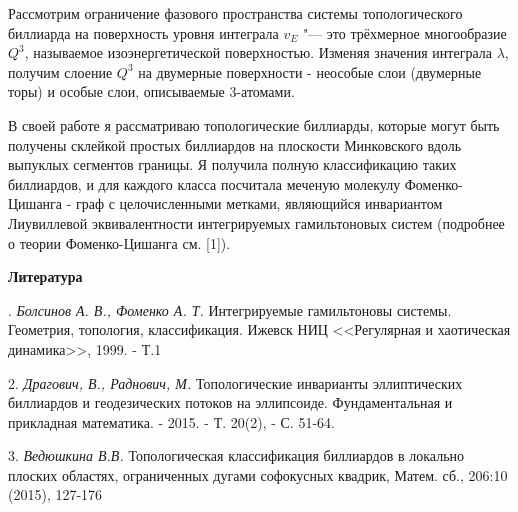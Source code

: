 Рассмотрим ограничение фазового пространства системы топологического биллиарда на поверхность уровня интеграла $v_E$ "--- это трёхмерное многообразие $Q^3$, называемое изоэнергетической поверхностью. Изменяя значения интеграла $\lambda$, получим слоение $Q^3$ на двумерные поверхности - неособые слои (двумерные торы) и особые слои, описываемые 3-атомами.

В своей работе я рассматриваю топологические биллиарды, которые могут быть получены склейкой простых биллиардов на плоскости Минковского вдоль выпуклых сегментов границы. Я получила полную классификацию таких биллиардов, и для каждого класса посчитала меченую молекулу Фоменко-Цишанга - граф с целочисленными метками, являющийся инвариантом Лиувиллевой эквивалентности интегрируемых гамильтоновых систем (подробнее о теории Фоменко-Цишанга см. [1]).





\smallskip \centerline {\bf Литература} . {\it Болсинов А. В., Фоменко А. Т.} Интегрируемые гамильтоновы системы. Геометрия, топология, классификация. Ижевск НИЦ <<Регулярная и хаотическая динамика>>, 1999. - Т.1


2. {\it Драгович, В., Раднович, М.} Топологические инварианты эллиптических биллиардов и геодезических потоков на эллипсоиде. Фундаментальная и прикладная математика. - 2015. - Т. 20(2), - С. 51-64.

3. {\it Ведюшкина В.В.} Топологическая классификация биллиардов в локально плоских областях,
ограниченных дугами софокусных квадрик, Матем. сб., 206:10 (2015), 127-176
